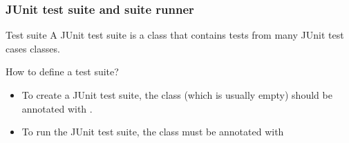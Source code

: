 \begin{frame}[parent={concept:junit}, hasprev=false, hasnext=false]
\frametitle{JUnit test suite and suite runner}
\label{concept:junit-test-suite}
\label{concept:test-suite}

\begin{block:concept}{Test suite}
A JUnit test suite is a class that contains tests from many JUnit test
cases classes.
\end{block:concept}

\begin{block:procedure}{How to define a test suite?}
\begin{itemize}
	\item To create a JUnit test suite, the class (which is usually empty)
	should be annotated with .

	\item To run the JUnit test suite, the class must be annotated with
\end{itemize}
\end{block:procedure}

\hfill
{}
\end{frame}